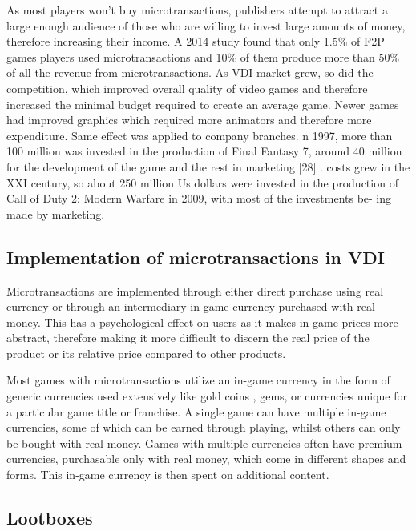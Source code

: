 \documentclass[10pt,british,a4paper,titlepage]{article}
\begin{document}
As most players won’t buy microtransactions, publishers attempt to attract a large enough audience of those who are willing to invest large amounts of money, therefore increasing their income. A 2014 study found that only 1.5\% of F2P games players used microtransactions and 10\% of them produce more than 50\% of all the revenue from microtransactions\cite{tomic2018economic:micro}.
As VDI market grew, so did the competition, which improved overall quality of video games and therefore increased the minimal budget required to create an average game. Newer games had improved graphics which required more animators and therefore more expenditure. Same effect was applied to company branches. n 1997, more than   100 million was invested in the
production of Final Fantasy 7, around 40 million for the
development of the game and the rest in marketing [28] .
costs grew in the XXI century, so about 250 million Us
dollars were invested in the production of Call of Duty 2:
Modern Warfare in 2009, with most of the investments be-
ing made by marketing.


\subsection{Implementation of microtransactions in VDI}

Microtransactions are implemented through either direct purchase using real currency or through an intermediary in-game currency purchased with real money. This has a psychological effect on users as it makes in-game prices more abstract, therefore making it more difficult to discern the real price of the product or its relative price compared to other products\cite{tomic2018economic:micro}.

Most games with microtransactions utilize an in-game currency in the form of generic currencies used extensively like gold coins , gems, or currencies unique for a particular game title or franchise. A single game can have multiple in-game currencies, some of which can be earned through playing, whilst others can only be bought with real money. Games with multiple currencies often have premium currencies, purchasable only with real money, which come in different shapes and forms. This in-game currency is then spent on additional content.



\subsection{Lootboxes}
\end{document}
